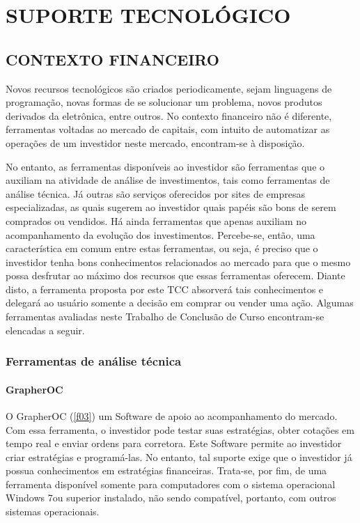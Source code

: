 \chapter[SUPORTE TECNOLOGICO]{SUPORTE TECNOLÓGICO}
\section{CONTEXTO FINANCEIRO}

Novos recursos tecnológicos são criados periodicamente, sejam linguagens de programação, novas formas de se solucionar um problema, novos produtos derivados da eletrônica, entre outros. No contexto financeiro não é diferente, ferramentas voltadas ao mercado de capitais, com intuito de automatizar as operações de um investidor neste mercado, encontram-se à disposição.

No entanto, as ferramentas disponíveis ao investidor são ferramentas que o auxiliam na atividade de análise de investimentos, tais como ferramentas de análise técnica. Já outras são serviços oferecidos por sites de empresas especializadas, as quais sugerem ao investidor quais papéis são bons de serem comprados ou vendidos. Há ainda ferramentas que apenas auxiliam no acompanhamento da evolução dos investimentos. Percebe-se, então, uma característica em comum entre estas ferramentas, ou seja, é preciso que o investidor tenha bons conhecimentos relacionados ao mercado para que o mesmo possa desfrutar ao máximo dos recursos que essas ferramentas oferecem. Diante disto, a ferramenta proposta por este TCC absorverá tais conhecimentos e delegará ao usuário somente a decisão em comprar ou vender uma ação. Algumas ferramentas avaliadas neste Trabalho de Conclusão de Curso encontram-se elencadas a seguir.

\subsection{Ferramentas de análise técnica}

\subsubsection{GrapherOC}

O GrapherOC (\ref{f03}) um Software de apoio ao acompanhamento do mercado. Com essa ferramenta, o investidor pode testar suas estratégias, obter cotações em tempo real e enviar ordens para corretora. Este Software permite ao investidor criar estratégias e programá-las. No entanto, tal suporte exige que o investidor já possua conhecimentos em estratégias financeiras. Trata-se, por fim, de uma ferramenta disponível somente para computadores com o sistema operacional Windows 7\textregistered ou superior instalado, não sendo compatível, portanto, com outros sistemas operacionais.


